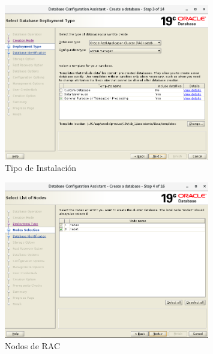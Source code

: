 \documentclass{article}
\begin{document}
\begin{figure}[H]
		\begin{center}
			\includegraphics[width=0.80\textwidth]{db_creation_4_deployment_type.png}
		\end{center}
		\caption{Tipo de Instalación}
\end{figure}


\begin{figure}[H]
		\begin{center}
			\includegraphics[width=0.80\textwidth]{db_creation_5_nodes_selection.png}
		\end{center}
		\caption{Nodos de RAC}
\end{figure}
\end{document}

